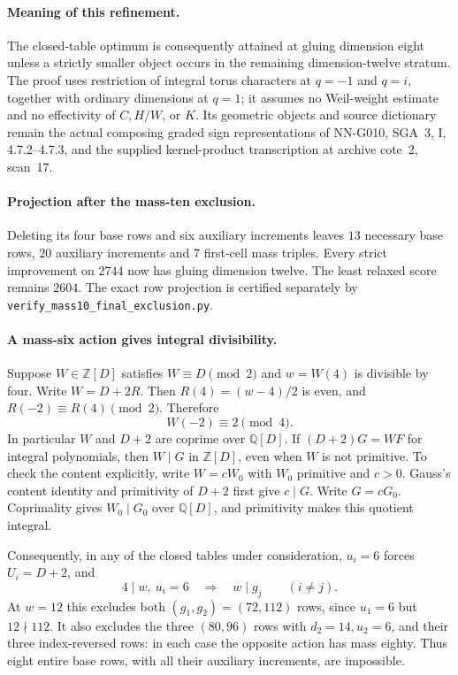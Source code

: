 \paragraph{Meaning of this refinement.}
The closed-table optimum is consequently attained at
gluing dimension eight unless a strictly smaller object
occurs in the remaining dimension-twelve stratum.
The proof uses restriction of integral torus characters
at $q=-1$ and $q=i$, together with ordinary dimensions
at $q=1$; it assumes no Weil-weight estimate and no
effectivity of $C,H/W$, or $K$.
Its geometric objects and source dictionary remain the
actual composing graded sign representations of NN-G010,
SGA~3, I, 4.7.2--4.7.3, and the supplied kernel-product
transcription at archive cote~2, scan~17.

\paragraph{Projection after the mass-ten exclusion.}
Deleting its four base rows and six auxiliary increments leaves
$13$ necessary base rows, $20$ auxiliary increments and
$7$ first-cell mass triples. Every strict improvement on
$2744$ now has gluing dimension twelve. The least relaxed
score remains $2604$. The exact row projection is certified
separately by \texttt{verify\_mass10\_final\_exclusion.py}.


\paragraph{A mass-six action gives integral divisibility.}
Suppose $W\in\mathbb Z[D]$ satisfies $W\equiv D\pmod2$
and $w=W(4)$ is divisible by four.
Write $W=D+2R$. Then $R(4)=(w-4)/2$ is even,
and $R(-2)\equiv R(4)\pmod2$. Therefore
\[
                         W(-2)\equiv2\pmod4.        \tag{G036.U1}
\]
In particular $W$ and $D+2$ are coprime over
$\mathbb Q[D]$.
If $(D+2)G=W F$ for integral polynomials, then
$W\mid G$ in $\mathbb Z[D]$, even when $W$ is
not primitive. To check the content explicitly,
write $W=cW_0$ with $W_0$ primitive and $c>0$.
Gauss's content identity and primitivity of $D+2$
first give $c\mid G$. Write $G=cG_0$.
Coprimality gives $W_0\mid G_0$ over $\mathbb Q[D]$,
and primitivity makes this quotient integral.

Consequently, in any of the closed tables under
consideration, $u_i=6$ forces $U_i=D+2$, and
\[
                 4\mid w,\ u_i=6
                 \quad\Longrightarrow\quad w\mid g_j
                 \qquad(i\ne j).                  \tag{G036.U2}
\]
At $w=12$ this excludes both $(g_1,g_2)=(72,112)$
rows, since $u_1=6$ but $12\nmid112$.
It also excludes the three $(80,96)$ rows with
$d_2=14,u_2=6$, and their three index-reversed rows:
in each case the opposite action has mass eighty.
Thus eight entire base rows, with all their auxiliary
increments, are impossible.

